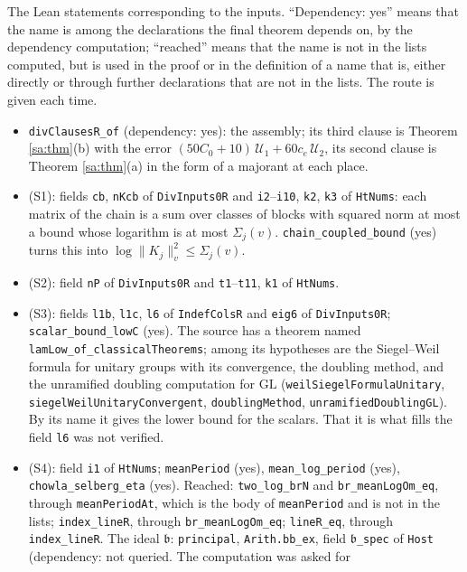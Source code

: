 \documentclass[11pt,letterpaper]{article}
\begin{document}
The Lean statements corresponding to the inputs. ``Dependency: yes'' means that the name is among the
declarations the final theorem depends on, by the dependency computation; ``reached'' means that the name
is not in the lists computed, but is used in the proof or in the definition of a name that is, either
directly or through further declarations that are not in the lists. The route is given each time.
\begin{itemize}[leftmargin=1.6em,itemsep=2pt,topsep=3pt]
\item \texttt{divClausesR\_of} (dependency: yes): the assembly; its third clause is Theorem
\ref{sa:thm}(b) with the error $(50C_0+10)\,\mathcal U_1+60c_e\,\mathcal U_2$, its second clause is
Theorem \ref{sa:thm}(a) in the form of a majorant at each place.
\item (S1): fields \texttt{cb}, \texttt{nKcb} of \texttt{DivInputs0R} and \texttt{i2}--\texttt{i10},
\texttt{k2}, \texttt{k3} of \texttt{HtNums}: each matrix of the chain is a sum over classes of blocks
with squared norm at most a bound whose logarithm is at most $\Sigma_j(v)$.
\texttt{chain\_coupled\_bound} (yes) turns this into $\log\|K_j\|_v^2\le\Sigma_j(v)$.
\item (S2): field \texttt{nP} of \texttt{DivInputs0R} and \texttt{t1}--\texttt{t11}, \texttt{k1} of
\texttt{HtNums}.
\item (S3): fields \texttt{l1b}, \texttt{l1c}, \texttt{l6} of \texttt{IndefColsR} and \texttt{eig6} of
\texttt{DivInputs0R}; \texttt{scalar\_bound\_lowC} (yes). The source has a theorem named
\texttt{lamLow\_of\_classicalTheorems}; among its hypotheses are the Siegel--Weil formula for unitary
groups with its convergence, the doubling method, and the unramified doubling computation for
$\mathrm{GL}$ (\texttt{weilSiegelFormulaUnitary}, \texttt{siegelWeilUnitaryConvergent},
\texttt{doublingMethod}, \texttt{unramifiedDoublingGL}). By its name it gives the lower bound for the
scalars. That it is what fills the field \texttt{l6} was not verified.
\item {\sloppy (S4): field \texttt{i1} of \texttt{HtNums}; \texttt{meanPeriod} (yes), \texttt{mean\_log\_period}
(yes), \texttt{chowla\_selberg\_eta} (yes). Reached: \texttt{two\_log\_brN} and \texttt{br\_meanLogOm\_eq},
through \texttt{meanPeriodAt}, which is the body of \texttt{meanPeriod} and is not in the lists;
\texttt{index\_lineR}, through \texttt{br\_meanLogOm\_eq}; \texttt{lineR\_eq}, through
\texttt{index\_lineR}. The ideal $\mathfrak b$: \texttt{principal}, \texttt{Arith.bb\_ex}, field
$\mathfrak b$\texttt{\_spec} of \texttt{Host} (dependency: not queried. The computation was asked for
}
\end{itemize}
\end{document}
